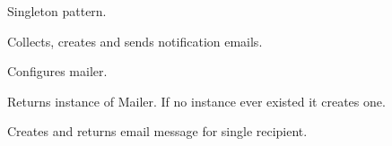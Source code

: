 \documentclass[letterpaper,10pt,english]{sphinxmanual}
\begin{document}
\begin{fulllineitems}
\label{index:spy.ImproperlyConfigured}
\end{fulllineitems}


\begin{fulllineitems}
Singleton pattern.

Collects, creates and sends notification emails.

\begin{fulllineitems}
\label{index:spy.Mailer.NotSingle}
\end{fulllineitems}


\begin{fulllineitems}
\label{index:spy.Mailer._Mailer__instance}
\end{fulllineitems}


\begin{fulllineitems}
Configures mailer.

\end{fulllineitems}


\begin{fulllineitems}
Returns instance of Mailer.
If no instance ever existed it creates one.

\end{fulllineitems}


\begin{fulllineitems}
Creates and returns email message for single recipient.

\end{fulllineitems}


\end{fulllineitems}
\end{document}
